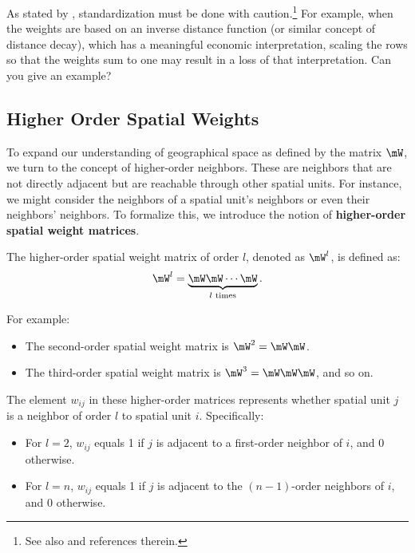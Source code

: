 \begin{remark}
As stated by \citet[][p. 23-24]{anselin1988spatial}, standardization must be done with caution.\footnote{See also \citet[][p. 12]{elhorst2014spatial} and references therein.} For example, when the weights are based on an inverse distance function (or similar concept of distance decay), which has a meaningful economic interpretation, scaling the rows so that the weights sum to one may result in a loss of that interpretation. Can you give an example?
\end{remark}


\subsection{Higher Order Spatial Weights}\label{sec:HSO}

To expand our understanding of geographical space as defined by the matrix $\mW$, we turn to the concept of higher-order neighbors. These are neighbors that are not directly adjacent but are reachable through other spatial units. For instance, we might consider the neighbors of a spatial unit's neighbors or even their neighbors' neighbors. To formalize this, we introduce the notion of \textbf{higher-order spatial weight matrices}.

The higher-order spatial weight matrix of order $l$, denoted as $\mW^l$, is defined as:
\begin{equation*}
  \mW^l = \underbrace{\mW \mW \cdots \mW}_{l \text{ times}}.
\end{equation*}

For example:
\begin{itemize}
\item The second-order spatial weight matrix is $\mW^2 = \mW\mW$.
\item The third-order spatial weight matrix is $\mW^3 = \mW \mW\mW$, and so on.
\end{itemize}

The element $w_{ij}$ in these higher-order matrices represents whether spatial unit $j$ is a neighbor of order $l$ to spatial unit $i$. Specifically:
\begin{itemize}
\item For $l = 2$, $w_{ij}$ equals 1 if $j$ is adjacent to a first-order neighbor of $i$, and 0 otherwise.
\item For $l = n$, $w_{ij}$ equals 1 if $j$ is adjacent to the $(n-1)$-order neighbors of $i$, and 0 otherwise.
\end{itemize}

